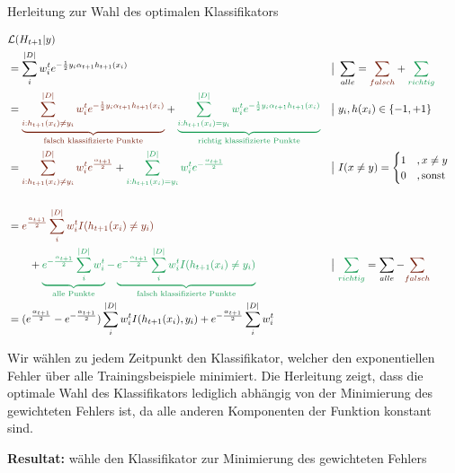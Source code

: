 \documentclass[a4paper,12pt]{scrartcl}
\begin{document}
\begin{equationfloat}[!h]
	\caption{Herleitung zur Wahl des optimalen Klassifikators}
	\begin{align*}
	 & \mathcal{L}(H_{t+1}\vert y) 
	 &
	 \\
	 & = \sum_i^{\vert D\vert} w_i^t e^{-\frac{1}{2} y_i \alpha_{t+1} h_{t+1}(x_i)}
	 && \big\vert~\sum_{alle} = \textcolor{Brown}{\sum_{falsch}} + \textcolor{ForestGreen}{\sum_{richtig}}
	 \\
	 & = \textcolor{Brown}{\underbrace{\sum_{i: h_{t+1}(x_i) \neq y_i}^{\vert D\vert} w_i^t e^{-\frac{1}{2} y_i \alpha_{t+1} h_{t+1}(x_i)}}_{\text{falsch klassifizierte Punkte}}} + \textcolor{ForestGreen}{\underbrace{\sum_{i: h_{t+1}(x_i) = y_i}^{\vert D\vert} w_i^t e^{-\frac{1}{2} y_i \alpha_{t+1} h_{t+1}(x_i)}}_{\text{richtig klassifizierte Punkte}}}
	 && \big\vert~ y_i, h(x_i) \in \{-1, +1 \}
	 \\
	 & = \textcolor{Brown}{\sum_{i: h_{t+1}(x_i) \neq y_i}^{\vert D\vert} w_i^t e^{\frac{\alpha_{t+1}}{2}}} + \textcolor{ForestGreen}{\sum_{i: h_{t+1}(x_i) = y_i}^{\vert D\vert} w_i^t e^{-\frac{\alpha_{t+1}}{2}}}
	 && \big\vert~  I(x \neq y) = \begin{cases} 1 &, x \neq y\\ 0 & ,\mbox{sonst} \end{cases}\\
	 & 
	 \\
	 & = \textcolor{Brown}{e^{\frac{\alpha_{t+1}}{2}} \sum_{i}^{\vert D\vert} w_i^t I(h_{t+1}(x_i) \neq y_i)} 
	 \\
	 & \qquad + \textcolor{ForestGreen}{\underbrace{e^{-\frac{\alpha_{t+1}}{2}}\sum_i^{\vert D\vert} w_i^t}_{\text{alle Punkte}} - 
	 	\underbrace{e^{-\frac{\alpha_{t+1}}{2}}\sum_{i}^{\vert D\vert} w_i^t I(h_{t+1}(x_i) \neq y_i)}_{\text{falsch  klassifizierte Punkte}}}
 	 && \big\vert~\textcolor{ForestGreen}{\sum_{richtig}} = \sum_{alle} - \textcolor{Brown}{\sum_{falsch}}
 	 \\
 	 & = (e^{\frac{\alpha_{t+1}}{2}} - e^{-\frac{\alpha_{t+1}}{2}}) \sum_{i}^{\vert D\vert} w_i^t I(h_{t+1}(x_i), y_i) + e^{-\frac{\alpha_{t+1}}{2}}\sum_i^{\vert D\vert} w_i^t
	\end{align*}
	
	Wir wählen zu jedem Zeitpunkt den Klassifikator, welcher den exponentiellen Fehler über alle Trainingsbeispiele minimiert. Die Herleitung zeigt, dass die optimale Wahl des Klassifikators lediglich abhängig von der Minimierung des gewichteten Fehlers ist, da alle anderen Komponenten der Funktion konstant sind.
	
	\textbf{Resultat:} wähle den Klassifikator zur Minimierung des gewichteten Fehlers
\end{equationfloat}
\end{document}
